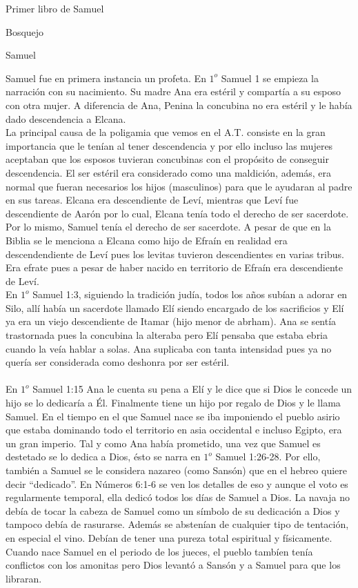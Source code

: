 \begin{section}{Primer libro de Samuel}
\begin{subsection}{Bosquejo}
\begin{subsubsection}{Samuel}
\begin{enumerate}
					Samuel fue en primera instancia un profeta. En $1^{o}$ Samuel 1 se empieza la narración con su nacimiento. Su madre Ana era estéril y compartía a su esposo con otra mujer. A diferencia de Ana, Penina la concubina no era estéril y le había dado descendencia a Elcana.\\
 La principal causa de la poligamia que vemos en el A.T. consiste en la gran importancia que le tenían al tener descendencia y por ello incluso las mujeres aceptaban que los esposos tuvieran concubinas con el propósito de conseguir descendencia. El ser estéril era considerado como una maldición, además, era normal que fueran necesarios los hijos (masculinos) para que le ayudaran al padre en sus tareas. Elcana era descendiente de Leví, mientras que Leví fue descendiente de Aarón por lo cual, Elcana tenía todo el derecho de ser sacerdote. Por lo mismo, Samuel tenía el derecho de ser sacerdote.
 \newpage
 A pesar de que en la Biblia se le menciona a Elcana como hijo de Efraín en realidad era descendendiente de Leví pues los levitas tuvieron descendientes en varias tribus. Era efrate pues a pesar de haber nacido en territorio de Efraín era descendiente de Leví.\\
 En $1^{o}$ Samuel 1:3, siguiendo la tradición judía, todos los años subían a adorar en Silo, allí había un sacerdote llamado Elí siendo encargado de los sacrificios y Elí ya era un viejo descendiente de Itamar (hijo menor de abrham). Ana se sentía trastornada pues la concubina la alteraba pero Elí pensaba que estaba ebria cuando la veía hablar a solas. Ana suplicaba con tanta intensidad pues ya no quería ser considerada como deshonra por ser estéril.\\ \\
 En $1^{o}$ Samuel 1:15 Ana le cuenta su pena a Elí y le dice que si Dios le concede un hijo se lo dedicaría a Él. Finalmente tiene un hijo por regalo de Dios y le llama Samuel. En el tiempo en el que Samuel nace se iba imponiendo el pueblo asirio que estaba dominando todo el territorio en asia occidental e incluso Egipto, era un gran imperio. Tal y como Ana había prometido, una vez que Samuel es destetado se lo dedica a Dios, ésto se narra en $1^{o}$ Samuel 1:26-28. Por ello, también a Samuel se le considera nazareo (como Sansón) que en el hebreo quiere decir ``dedicado''. En Números 6:1-6 se ven los detalles de eso y aunque el voto es regularmente temporal, ella dedicó todos los días de Samuel a Dios. La navaja no debía de tocar la cabeza de Samuel como un símbolo de su dedicación a Dios y tampoco debía de rasurarse. Además se abstenían de cualquier tipo de tentación, en especial el vino. Debían de tener una pureza total espiritual y físicamente. Cuando nace Samuel en el periodo de los jueces, el pueblo tambíen tenía conflictos con los amonitas pero Dios levantó a Sansón y a Samuel para que los libraran.\\ \\

\end{enumerate}
\end{subsubsection}
\end{subsection}
\end{section}
